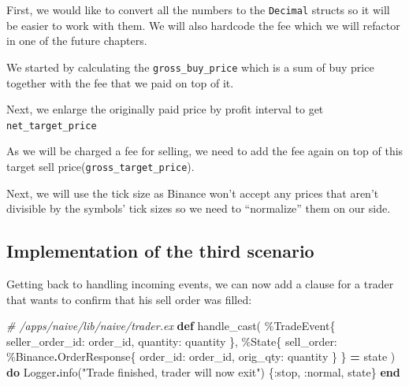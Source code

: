 \documentclass[
  oneside]{book}
\newenvironment{Shaded}{\begin{snugshade}}{\end{snugshade}}
\newcommand{\CommentTok}[1]{\textcolor[rgb]{0.56,0.35,0.01}{\textit{#1}}}
\newcommand{\ConstantTok}[1]{\textcolor[rgb]{0.00,0.00,0.00}{#1}}
\newcommand{\KeywordTok}[1]{\textcolor[rgb]{0.13,0.29,0.53}{\textbf{#1}}}
\newcommand{\NormalTok}[1]{#1}
\newcommand{\OperatorTok}[1]{\textcolor[rgb]{0.81,0.36,0.00}{\textbf{#1}}}
\newcommand{\StringTok}[1]{\textcolor[rgb]{0.31,0.60,0.02}{#1}}
\newcommand{\VariableTok}[1]{\textcolor[rgb]{0.00,0.00,0.00}{#1}}
\begin{document}
First, we would like to convert all the numbers to the \texttt{Decimal} structs so it will be easier to work with them. We will also hardcode the fee which we will refactor in one of the future chapters.

We started by calculating the \texttt{gross\_buy\_price} which is a sum of buy
price together with the fee that we paid on top of it.

Next, we enlarge the originally paid price by profit interval to get \texttt{net\_target\_price}

As we will be charged a fee for selling, we need to add the fee again on top of this target sell price(\texttt{gross\_target\_price}).

Next, we will use the tick size as Binance won't accept any prices that aren't divisible by the symbols' tick sizes so we need to ``normalize'' them on our side.

\hypertarget{implementation-of-the-third-scenario}{%
\subsection{Implementation of the third scenario}\label{implementation-of-the-third-scenario}}

Getting back to handling incoming events, we can now add a clause for a trader that wants to confirm that his sell order was filled:

\begin{Shaded}
\begin{Highlighting}[]
  \CommentTok{\# /apps/naive/lib/naive/trader.ex}
  \KeywordTok{def}\NormalTok{ handle\_cast(}
\NormalTok{        \%}\ConstantTok{TradeEvent}\NormalTok{\{}
          \VariableTok{seller\_order\_id:}\NormalTok{ order\_id,}
          \VariableTok{quantity:}\NormalTok{ quantity}
\NormalTok{        \},}
\NormalTok{        \%}\ConstantTok{State}\NormalTok{\{}
          \VariableTok{sell\_order:}\NormalTok{ \%}\ConstantTok{Binance}\OperatorTok{.}\ConstantTok{OrderResponse}\NormalTok{\{}
            \VariableTok{order\_id:}\NormalTok{ order\_id,}
            \VariableTok{orig\_qty:}\NormalTok{ quantity}
\NormalTok{          \}}
\NormalTok{        \} }\OperatorTok{=}\NormalTok{ state}
\NormalTok{      ) }\KeywordTok{do}
    \ConstantTok{Logger}\OperatorTok{.}\NormalTok{info(}\StringTok{"Trade finished, trader will now exit"}\NormalTok{)}
\NormalTok{    \{}\VariableTok{:stop}\NormalTok{, }\VariableTok{:normal}\NormalTok{, state\}}
  \KeywordTok{end}
\end{Highlighting}
\end{Shaded}
\end{document}
